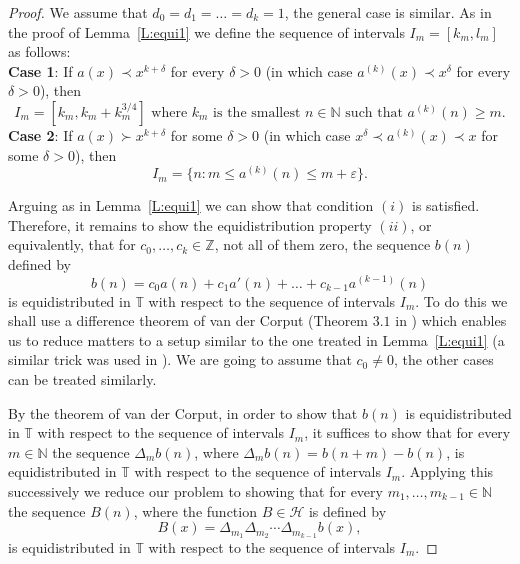 \documentclass[11pt]{amsart}
\renewcommand{\H}{\mathcal{H}}
\newcommand{\T}{\mathbb{T}}
\newcommand{\N}{\mathbb{N}}
\newcommand{\Z}{\mathbb{Z}}
\theoremstyle{plain}
\theoremstyle{definition}
\theoremstyle{remark}
\begin{document}
\begin{proof}
  We assume that $d_0=d_1=\ldots=d_k=1$, the general case is similar.
  As in the proof of Lemma~\ref{L:equi1} we define the sequence of intervals $I_m=[k_m,l_m]$ as follows: \\
  {\bf Case 1}: If $a(x)\prec x^{k+\delta}$ for every $\delta>0$ (in
  which case $a^{(k)}(x)\prec x^\delta$ for every $\delta>0$), then
$$
I_m=[k_m,k_m+k_m^{3/4}] \text{ where } k_m \text{ is the smallest }
n\in \N \text{ such that } a^{(k)}(n)\geq m.
$$
{\bf Case 2}: If $ a(x)\succ x^{k+\delta}$ for some $\delta>0$ (in
which case $x^{\delta}\prec a^{(k)}(x)\prec x$ for some $\delta>0$),
then
$$
I_m=\{n\colon m\leq a^{(k)}(n) \leq m+\varepsilon\}.
$$

Arguing as in Lemma~\ref{L:equi1} we can show that condition $(i)$ is
satisfied.  Therefore, it remains to show the equidistribution property
$(ii)$, or equivalently, that for $c_0,\ldots,c_k\in \Z$, not all of
them zero, the sequence $b(n)$ defined by
$$
b(n)=c_0a(n)+c_1a'(n)+\ldots +c_{k-1}a^{(k-1)}(n)
$$ is equidistributed in $\T$
with respect to the sequence of intervals $I_m$.  To do this we shall
use a difference theorem of van der Corput (Theorem $3.1$ in
\cite{KN}) which enables us to reduce matters  to a setup similar to the
one treated in Lemma~\ref{L:equi1} (a similar trick was used in
\cite{Bo3}). We are going to  assume that $c_0\neq 0$,  the other cases can
be treated similarly.

By the theorem of van der Corput, in order to show that $b(n)$ is
equidistributed in $\T$ with respect to the sequence of intervals
$I_m$, it suffices to show that for every $m\in\N$ the sequence
$\Delta_mb(n)$, where $\Delta_mb(n)=b(n+m)-b(n)$, is equidistributed
in $\T$ with respect to the sequence of intervals $I_m$. Applying this
successively we reduce our problem to showing that for every
$m_1,\ldots,m_{k-1}\in\N$ the sequence $B(n)$, where the function $B\in \H$ is defined by
$$
B(x)=\Delta_{m_1}\Delta_{m_2}\cdots\Delta_{m_{k-1}}b(x),
$$
is equidistributed in $\T$ with respect to the sequence of intervals
$I_m$.


\end{proof}
\end{document}
